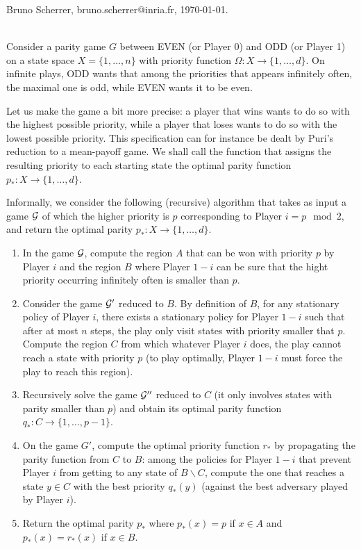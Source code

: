 \documentclass{article}
\def\G{{\cal G}}
\begin{document}
\noindent Bruno Scherrer, bruno.scherrer@inria.fr, \today.

~\\

Consider a parity game $G$ between EVEN (or Player 0) and ODD (or Player 1) on a state space $X=\{1,\dots,n\}$ with priority function $\Omega:X \to \{1,\dots,d\}$. On infinite plays, ODD wants that among the priorities that appears infinitely often, the maximal one is odd, while EVEN wants it to be even.

Let us make the game a bit more precise: a player that wins wants to do so with the highest possible priority, while a player that loses wants to do so with the lowest possible priority. This specification can for instance be dealt by Puri's reduction to a mean-payoff game. We shall call the function that assigns the resulting priority to each starting state the optimal parity function $p_*:X \to \{1,\dots,d\}$. 

Informally, we consider the following (recursive) algorithm that takes as input a game $\G$ of which the higher priority is $p$ corresponding to Player $i=p \mod 2$, and return the optimal parity $p_*:X \to \{1,\dots,d\}$.
\begin{enumerate}
\item In the game $\G$, compute the region $A$  that can be won with priority $p$ by Player $i$ and the region $B$ where Player $1-i$ can be sure that the hight priority occurring infinitely often is smaller than $p$.
\item Consider the game $\G'$ reduced to $B$. By definition of $B$, for any stationary policy of Player $i$, there exists a stationary policy for Player $1-i$ such that after at most $n$ steps, the play only visit states with priority smaller that $p$. Compute the region $C$ from which whatever Player $i$ does, the play cannot reach a state with priority $p$ (to play optimally, Player $1-i$ must force the play to reach this region).
\item Recursively solve the game $\G''$ reduced to $C$ (it only involves states with parity smaller than $p$) and obtain its optimal parity function $q_*:C \to \{1,\dots,p-1\}$. 
\item On the game $G'$, compute the optimal priority function $r_*$ by propagating the parity function from $C$ to $B$: among the policies for Player $1-i$ that prevent Player $i$ from getting to any state of $B \backslash C$, compute the one that reaches a state $y \in C$ with the best priority $q_*(y)$ (against the best adversary played by Player $i$). 
\item Return the optimal parity $p_*$ where $p_*(x)=p$ if $x \in A$ and $p_*(x)=r_*(x)$ if $x \in B$. 
\end{enumerate}
\end{document}
